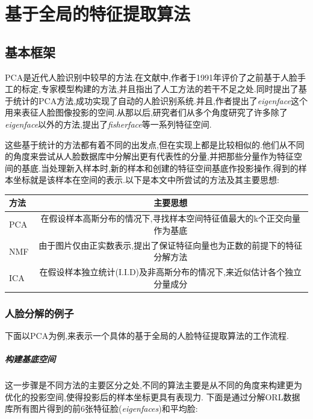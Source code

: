 \chapter{基于全局的特征提取算法}

\section{基本框架}
PCA\cite{turk1991face}是近代人脸识别中较早的方法.在文献中,作者于1991年评价了之前基于人脸手工的标定,专家模型构建的方法,并且指出了人工方法的若干不足之处.同时提出了基于统计的PCA方法,成功实现了自动的人脸识别系统.并且,作者提出了\textit{eigenface}这个用来表征人脸图像投影的空间.从那以后,研究者们从多个角度研究了许多除了\textit{eigenface}以外的方法,提出了\textit{fisherface}\cite{kwak2005face}等一系列特征空间.

这些基于统计的方法都有着不同的出发点,但在实现上都是比较相似的.他们从不同的角度来尝试从人脸数据库中分解出更有代表性的分量,并把那些分量作为特征空间的基底.当处理新入样本时,新的样本和创建的特征空间基底作投影操作,得到的样本坐标就是该样本在空间的表示.以下是本文中所尝试的方法及其主要思想:
\begin{center}
  \footnotesize
  \begin{tabular}{l|c}
  \hline 
    方法 & 主要思想 \\ \hline
    PCA & 在假设样本高斯分布的情况下,寻找样本空间特征值最大的k个正交向量作为基底\\ \hline
    NMF & 由于图片仅由正实数表示,提出了保证特征向量也为正数的前提下的特征分解方法\\ \hline
    ICA & 在假设样本独立统计(I.I.D)及非高斯分布的情况下,来近似估计各个独立分量成分\\
    \hline
  \end{tabular}
\end{center}
\subsection{人脸分解的例子}
下面以PCA为例,来表示一个具体的基于全局的人脸特征提取算法的工作流程.
\paragraph{构建基底空间} 这一步骤是不同方法的主要区分之处,不同的算法主要是从不同的角度来构建更为优化的投影空间,使得投影后的样本坐标更具有表现力.
\newline
下面是通过分解ORL数据库所有图片得到的前6张特征脸(\textit{eigenfaces})和平均脸:

